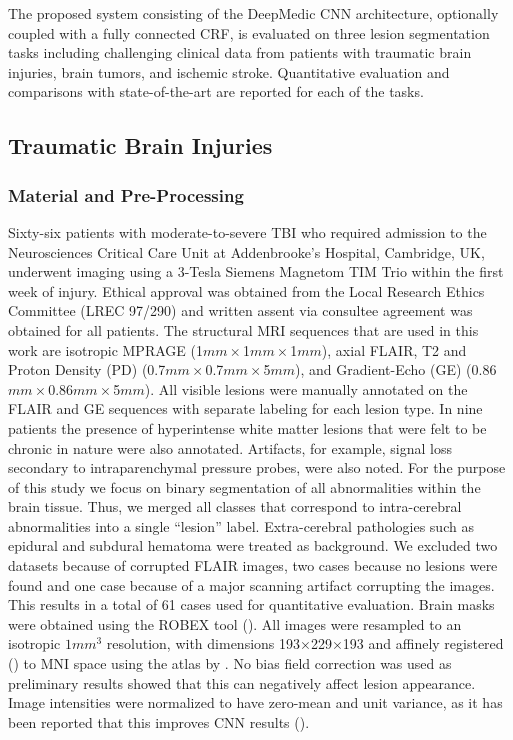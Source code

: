 \documentclass[preprint,authoryear,12pt]{elsarticle}
\newcommand{\quot}[1]{``#1''}
\newcommand{\ignore}[1]{}
\begin{document}
The proposed system consisting of the DeepMedic CNN architecture, optionally coupled with a fully connected CRF, is evaluated on three lesion segmentation tasks including challenging clinical data from patients with traumatic brain injuries, brain tumors, and ischemic stroke. Quantitative evaluation and comparisons with state-of-the-art are reported for each of the tasks.

\subsection{Traumatic Brain Injuries}
\label{subsec:evalTbi}

\subsubsection{Material and Pre-Processing}
\label{subsubsec:materialTbi}

Sixty-six patients  with moderate-to-severe TBI who required admission to the Neurosciences Critical Care Unit at Addenbrooke's Hospital, Cambridge, UK, underwent imaging using a 3-Tesla Siemens Magnetom TIM Trio within the first week of injury. Ethical approval was obtained from the Local Research Ethics Committee (LREC 97/290) and written assent via consultee agreement was obtained for all patients. The structural MRI sequences that are used in this work are isotropic MPRAGE (1$mm\times$1$mm\times$1$mm$), axial FLAIR, T2 and Proton Density (PD) (0.7$mm\times$0.7$mm\times$5$mm$), and Gradient-Echo (GE) (0.86$mm\times$0.86$mm\times$5$mm$). All visible lesions were manually annotated on the FLAIR and GE sequences with separate labeling for each lesion type. In nine patients the presence of hyperintense white matter lesions that were felt to be chronic in nature were also annotated. Artifacts, for example, signal loss secondary to intraparenchymal pressure probes, were also noted. For the purpose of this study we focus on binary segmentation of all abnormalities within the brain tissue. Thus, we merged all classes that correspond to intra-cerebral abnormalities into a single \quot{lesion} label. Extra-cerebral pathologies such as epidural and subdural hematoma were treated as background. We excluded two datasets because of corrupted FLAIR images\ignore{13296, 17792}, two cases because no lesions were found\ignore{13776, 15883} and one case \ignore{11976} because of a major scanning artifact corrupting the images. This results in a total of 61 cases used for quantitative evaluation. Brain masks were obtained using the ROBEX tool (\cite{Iglesias2011}). All images were resampled to an isotropic $1mm^3$ resolution, with dimensions 193$\times$229$\times$193 and affinely registered (\cite{Studholme1999}) to MNI space using the atlas by \cite{Grabner2006}. No bias field correction was used as preliminary results showed that this can negatively affect lesion appearance. Image intensities were normalized to have zero-mean and unit variance, as it has been reported that this improves CNN results (\cite{Jarrett2009}).
\end{document}
